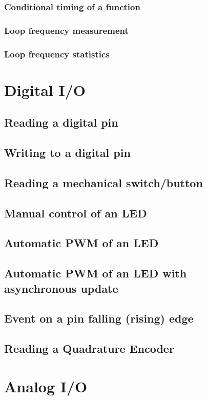 \documentclass[10pt,letterpaper]{memoir} %
\begin{document}
\subsection{Conditional timing of a function}
\subsection{Loop frequency measurement}
\subsection{Loop frequency statistics}

\chapter{Digital I/O}
\section{Reading a digital pin}
\section{Writing to a digital pin}
\section{Reading a mechanical switch/button}
\section{Manual control of an LED}
\section{Automatic PWM of an LED}
\section{Automatic PWM of an LED with asynchronous update}
\section{Event on a pin falling (rising) edge}
\section{Reading a Quadrature Encoder}

\chapter{Analog I/O}
\end{document}

